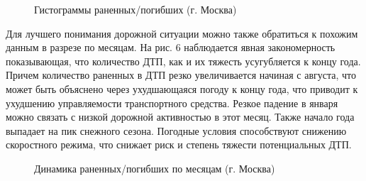 \documentclass[a4paper, 14pt]{article}
\begin{document}
\begin{figure}[h]
	\caption{Гистограммы раненных/погибших (г. Москва)}
\end{figure}

Для лучшего понимания дорожной ситуации можно также обратиться к похожим данным в разрезе по месяцам. На рис. 6 наблюдается явная закономерность показывающая, что количество ДТП, как и их тяжесть усугубляется к концу года. Причем количество раненных в ДТП резко увеличивается начиная с августа, что может быть объяснено через ухудшающаяся погоду к концу года, что приводит к ухудшению управляемости транспортного средства. Резкое падение в января можно связать с низкой дорожной активностью в этот месяц. Также начало года выпадает на пик снежного сезона. Погодные условия способствуют снижению скоростного режима, что снижает риск и степень тяжести потенциальных ДТП.

\begin{figure}[h]
	\caption{Динамика раненных/погибших по месяцам (г. Москва)}
\end{figure}
\end{document}
